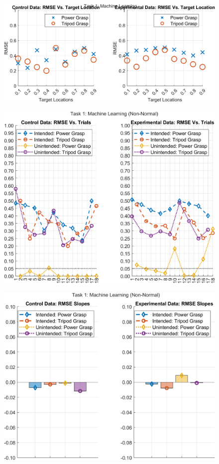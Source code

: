 \documentclass[12pt]{article}
\newcommand\figWidth{7in}
\begin{document}
\begin{figure}
    \includegraphics[width = \figWidth]{t1-rmse-reg.png}
\end{figure}
\newpage
\clearpage
\begin{figure}
    \includegraphics[width = \figWidth]{t1-rmse-xnorm.png}
\end{figure}
\begin{figure}
    \includegraphics[width = \figWidth]{t1-bar-xnorm.png}
\end{figure}
\end{document}
